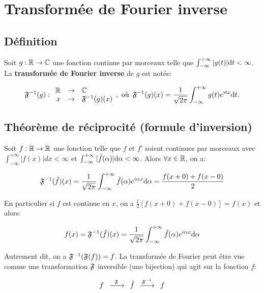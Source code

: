 \section{Transformée de Fourier inverse}


\subsection{Définition}

\begin{definition}
    Soit $g: \mathbb{R} \rightarrow \mathbb{C}$ une fonction continue par morceaux telle que $\int_{-\infty}^{+ \infty} |g(t)| \mathrm{d}t < \infty$.
    La \textbf{transformée de Fourier inverse} de $g$ est notée:
    
    \[
    \mathfrak{F}^{-1}(g):
    \begin{array}{r c l}
    \mathbb{R} & \rightarrow & \mathbb{C} \\
    x & \rightarrow & \mathfrak{F}^{-1}(g)(x)
    \end{array}, \textrm{ où}
    \enspace
    \mathfrak{F}^{-1}(g)(x) =
    \frac{1}{\sqrt{2 \pi}} \int_{-\infty}^{+\infty} g(t) e^{itx} \mathrm{d}t.
    \]
\end{definition}


\subsection{Théorème de réciprocité (formule d'inversion)}

\begin{theorem}[15.3.i, p.115]
    Soit $f: \mathbb{R} \rightarrow \mathbb{R}$ une fonction telle que $f$ et $f'$ soient continues par morceaux avec $\int_{-\infty}^{+ \infty} |f(x)| dx < \infty$ et $\int_{-\infty}^{+ \infty} |\hat{f}(\alpha)| \mathrm{d}\alpha < \infty$.
    Alors $\forall x \in \mathbb{R}$, on a:
    
    \[
    \mathfrak{F}^{-1} (\hat{f})(x) =
    \frac{1}{\sqrt{2 \pi}}\int_{-\infty}^{+ \infty} \hat{f}(\alpha) e^{i\alpha x}\mathrm{d}\alpha =
    \frac{f(x+0)+f(x-0)}{2}
    \]
    
    En particulier si $f$ est continue en $x$, on a $\frac{1}{2}[f(x+0) + f(x-0)] = f(x)$ et alors:
    
    \[
    f(x) = \mathfrak{F}^{-1} (\hat{f})(x) =
    \frac{1}{\sqrt{2 \pi}}
    \int_{-\infty}^{+ \infty}
    \hat{f}(\alpha) e^{i\alpha x}
    \mathrm{d}\alpha
    \]
    
    Autrement dit, on a $\mathfrak{F}^{-1}(\mathfrak{F}(f)) = f$.
    La transformée de Fourier peut être vue comme une \og transformation $\mathfrak{F}$ \fg{} inversible (une bijection) qui \og agit\fg{} sur la fonction $f$:
    
    \[
    f \enspace
    \xrightarrow{\enspace \mathfrak{F} \enspace}
    \enspace \hat{f} \enspace
    \xrightarrow{\mathfrak{F}^{-1}}
    \enspace f
    \]
\end{theorem}


